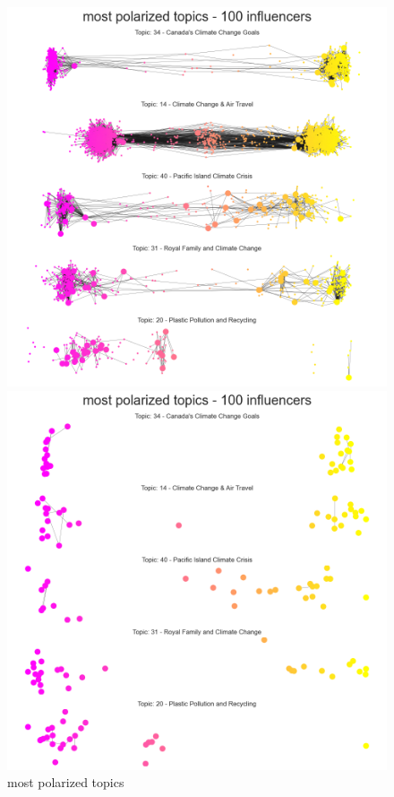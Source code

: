 \begin{figure}
    \centering
    \begin{minipage}{0.50\textwidth}
        \centering
         \includegraphics[width=0.98\linewidth]{Chapter5//figures/most_pol_cop26.png}
        \caption{most polarized topics}
    \end{minipage}\hfill
    \begin{minipage}{0.50\textwidth}
        \centering
         \includegraphics[width=0.98\linewidth]{Chapter5//figures/most_pol_cop26_inf.png}

\end{minipage}
\end{figure}
